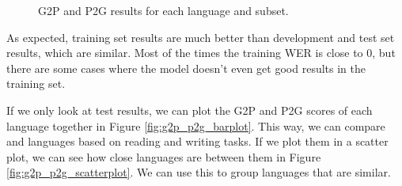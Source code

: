 \documentclass[11pt,a4paper]{article}
\begin{document}
\begin{figure}
    \centering
    \caption{G2P and P2G results for each language and subset.}
    \label{fig:g2p_p2g_results}
\end{figure}

As expected, training set results are much better than development and test set results, which are similar. Most of the times the training WER is close to 0, but there are some cases where the model doesn't even get good results in the training set.

If we only look at test results, we can plot the G2P and P2G scores of each language together in Figure \ref{fig:g2p_p2g_barplot}. This way, we can compare and languages based on reading and writing tasks. If we plot them in a scatter plot, we can see how close languages are between them in Figure \ref{fig:g2p_p2g_scatterplot}. We can use this to group languages that are similar.
\end{document}
